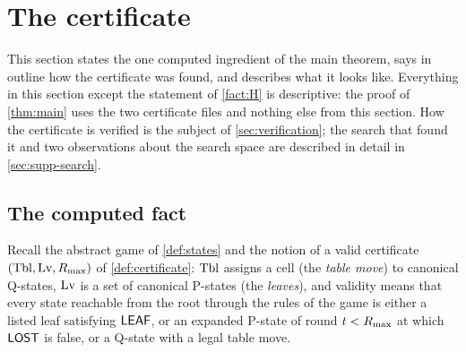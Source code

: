 \section{The certificate}\label{sec:certificate}


This section states the one computed ingredient of the main theorem, says in outline how the certificate
was found, and describes what it looks like. Everything in this
section except the statement of \cref{fact:H} is descriptive: the proof of \cref{thm:main}
uses the two certificate files and nothing else from this section. How the certificate is verified is the
subject of \cref{sec:verification}; the search that found it and two observations about the search
space are described in detail in \cref{sec:supp-search}.

\subsection{The computed fact}\label{ssec:fact}

Recall the abstract game of \cref{def:states} and the notion of a valid certificate $(\mathrm{Tbl},\mathrm{Lv},R_{\max})$ of
\cref{def:certificate}: $\mathrm{Tbl}$ assigns a cell (the \emph{table move})
to canonical Q-states, $\mathrm{Lv}$ is a set of canonical P-states (the \emph{leaves}), and validity means that every
state reachable from the root through the rules of the game is either a listed leaf satisfying
$\mathsf{LEAF}$, or an expanded P-state of round $t<R_{\max}$ at which $\mathsf{LOST}$ is false, or a Q-state with a legal table
move.

